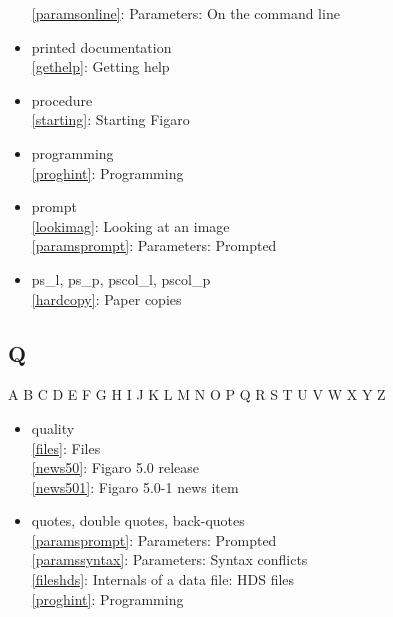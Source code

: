 \documentclass[11pt,twoside]{article}
\newcommand{\htmlref}[2]{#1}
\newcommand{\idxint}[2]{\ref{#1}: \htmlref{#2}{#1}}
\newcommand{\idxint}[2]{\htmlref{#2}{#1}}
\begin{document}
\begin{itemize}
   \idxint{paramsonline}{Parameters: On the command line}
\item printed documentation\\
   \idxint{gethelp}{Getting help}
\item procedure\\
   \idxint{starting}{Starting Figaro}
\item programming\\
   \idxint{proghint}{Programming}
\item prompt\\
   \idxint{lookimag}{Looking at an image}\\
   \idxint{paramsprompt}{Parameters: Prompted}
\item ps\_l, ps\_p, pscol\_l, pscol\_p\\
   \idxint{hardcopy}{Paper copies}
\end{itemize}

\subsection*{\label{index_Q}Q}

\begin{htmlonly}
\htmlref{A}{index_A}
\htmlref{B}{index_B}
\htmlref{C}{index_C}
\htmlref{D}{index_D}
\htmlref{E}{index_E}
\htmlref{F}{index_F}
\htmlref{G}{index_G}
\htmlref{H}{index_H}
\htmlref{I}{index_I}
\htmlref{J}{index_J}
\htmlref{K}{index_K}
\htmlref{L}{index_L}
\htmlref{M}{index_M}
\htmlref{N}{index_N}
\htmlref{O}{index_O}
\htmlref{P}{index_P}
Q
\htmlref{R}{index_R}
\htmlref{S}{index_S}
\htmlref{T}{index_T}
\htmlref{U}{index_U}
\htmlref{V}{index_V}
\htmlref{W}{index_W}
\htmlref{X}{index_X}
\htmlref{Y}{index_Y}
Z
\end{htmlonly}

\begin{itemize}
\item quality\\
   \idxint{files}{Files}\\
   \idxint{news50}{Figaro 5.0 release}\\
   \idxint{news501}{Figaro 5.0-1 news item}
\item quotes, double quotes, back-quotes\\
   \idxint{paramsprompt}{Parameters: Prompted}\\
   \idxint{paramssyntax}{Parameters: Syntax conflicts}\\
   \idxint{fileshds}{Internals of a data file: HDS files}\\
   \idxint{proghint}{Programming}
\end{itemize}
\end{document}

